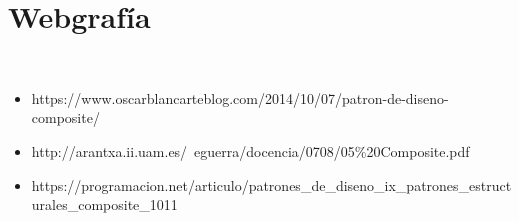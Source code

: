 \section{Webgrafía} 
\textbf{}\\
\begin{flushleft}

\begin{itemize}
	\item https://www.oscarblancarteblog.com/2014/10/07/patron-de-diseno-composite/
	\item http://arantxa.ii.uam.es/~eguerra/docencia/0708/05\%20Composite.pdf
	\item https://programacion.net/articulo/patrones\_de\_diseno\_ix\_patrones\_estructurales\_composite\_1011
	
	

\end{itemize} 


\end{flushleft}